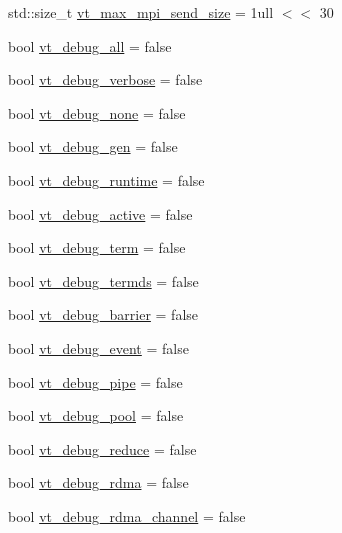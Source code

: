 \begin{DoxyCompactItemize}
std\+::size\+\_\+t \hyperlink{structvt_1_1arguments_1_1_app_config_aac217c9539cf7ee131cedc2c503ef866}{vt\+\_\+max\+\_\+mpi\+\_\+send\+\_\+size} = 1ull $<$$<$ 30
\item 
bool \hyperlink{structvt_1_1arguments_1_1_app_config_aac0dc7123449a6f4f3be90b4ef288ab9}{vt\+\_\+debug\+\_\+all} = false
\item 
bool \hyperlink{structvt_1_1arguments_1_1_app_config_a030b7c9ce9dc27b62819206d83c2ce21}{vt\+\_\+debug\+\_\+verbose} = false
\item 
bool \hyperlink{structvt_1_1arguments_1_1_app_config_a8b2bbece8ab4e091da537b2fc52669ea}{vt\+\_\+debug\+\_\+none} = false
\item 
bool \hyperlink{structvt_1_1arguments_1_1_app_config_a48d69aef2e39db18d9737e8888fd41f2}{vt\+\_\+debug\+\_\+gen} = false
\item 
bool \hyperlink{structvt_1_1arguments_1_1_app_config_a69b1371fb39fa1e541045c04cae8c28f}{vt\+\_\+debug\+\_\+runtime} = false
\item 
bool \hyperlink{structvt_1_1arguments_1_1_app_config_a506408dd0aad49b55666edfc525f8a29}{vt\+\_\+debug\+\_\+active} = false
\item 
bool \hyperlink{structvt_1_1arguments_1_1_app_config_af483dc1bffbd06359d89d937fd819b81}{vt\+\_\+debug\+\_\+term} = false
\item 
bool \hyperlink{structvt_1_1arguments_1_1_app_config_a25e50be9b687d7232a079a81d8e54e69}{vt\+\_\+debug\+\_\+termds} = false
\item 
bool \hyperlink{structvt_1_1arguments_1_1_app_config_a4621fa98bd8bf1e553696895d179fb6e}{vt\+\_\+debug\+\_\+barrier} = false
\item 
bool \hyperlink{structvt_1_1arguments_1_1_app_config_a542629c47a3b06e6f5de13f10bcd1a9b}{vt\+\_\+debug\+\_\+event} = false
\item 
bool \hyperlink{structvt_1_1arguments_1_1_app_config_acdac393e633248619b06c92c8ab37e5a}{vt\+\_\+debug\+\_\+pipe} = false
\item 
bool \hyperlink{structvt_1_1arguments_1_1_app_config_a750d786fe5cbd8997a125e15d22d5649}{vt\+\_\+debug\+\_\+pool} = false
\item 
bool \hyperlink{structvt_1_1arguments_1_1_app_config_afbd51efafa7ed24270a965af6e596232}{vt\+\_\+debug\+\_\+reduce} = false
\item 
bool \hyperlink{structvt_1_1arguments_1_1_app_config_ac744fcf1a3e63a83bc5a6c6f2c7f318c}{vt\+\_\+debug\+\_\+rdma} = false
\item 
bool \hyperlink{structvt_1_1arguments_1_1_app_config_a2220d56f6ae5d1ff6215e081d40cd002}{vt\+\_\+debug\+\_\+rdma\+\_\+channel} = false
$$
\end{DoxyCompactItemize}
